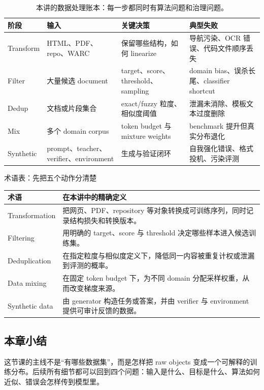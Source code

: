 \begin{table}[H]
\centering
\begin{tabular}{L{0.14\textwidth}L{0.25\textwidth}L{0.25\textwidth}L{0.22\textwidth}}
\toprule
阶段 & 输入 & 关键决策 & 典型失败 \\
\midrule
Transform & HTML、PDF、repo、WARC & 保留哪些结构，如何 linearize & 导航污染、OCR 错误、代码文件顺序丢失 \\
Filter & 大量候选 document & target、score、threshold、sampling & domain bias、误杀长尾、classifier shortcut \\
Dedup & 文档或片段集合 & exact/fuzzy 粒度、相似度阈值 & 泄漏未消除、模板文本过度删除 \\
Mix & 多个 domain corpus & token budget 与 mixture weights & benchmark 提升但真实分布退化 \\
Synthetic & prompt、teacher、verifier、environment & 生成与验证闭环 & 自我强化错误、格式投机、污染评测 \\
\bottomrule
\end{tabular}
\caption{本讲的数据处理账本：每一步都同时有算法问题和治理问题。}
\end{table}

\begin{knowledgebox}{术语表：先把五个动作分清楚}
\begin{tabular}{L{0.18\textwidth}L{0.72\textwidth}}
\toprule
术语 & 在本讲中的精确定义 \\
\midrule
Transformation & 把网页、PDF、repository 等对象转换成可训练序列，同时记录结构损失和转换版本。 \\
Filtering & 用明确的 target、score 与 threshold 决定哪些样本进入候选训练集。 \\
Deduplication & 在指定粒度与相似度定义下，降低同一内容被重复计权或泄漏到评测的概率。 \\
Data mixing & 在固定 token budget 下，为不同 domain 分配采样权重，从而改变梯度来源。 \\
Synthetic data & 由 generator 构造任务或答案，并由 verifier 与 environment 提供可审计反馈的数据。 \\
\bottomrule
\end{tabular}
\end{knowledgebox}

\subsection{本章小结}

这节课的主线不是“有哪些数据集”，而是怎样把 raw objects 变成一个可解释的训练分布。后续所有细节都可以回到四个问题：输入是什么、目标是什么、算法如何近似、错误会怎样传到模型里。

